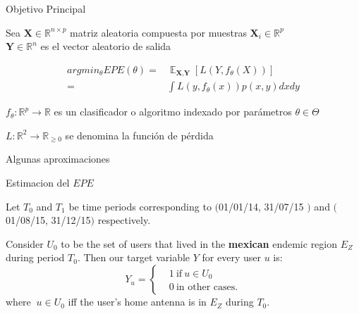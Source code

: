 \documentclass[xcolor=x11names]{beamer}
\DeclareMathOperator{\Expect}{\mathbb{E}}
\begin{document}
\begin{frame}{Objetivo Principal}
		\centering

		Sea $\textbf{X} \in \mathbb{R}^{n \times p}$ matriz aleatoria compuesta por muestras $\textbf{X}_i \in \mathbb{R}^{p}$\\
		$\textbf{Y} \in \mathbb{R}^n$ es el vector aleatorio de salida 

	\begin{equation}%
		\begin{split}
		argmin_{\theta} EPE(\theta) = & \Expect_{\textbf{X},\textbf{Y}} \left[ L(Y,f_\theta(X))\right]  \\
			= & \int L(y,f_\theta (x)) p(x,y) dx dy
		\end{split}
	\end{equation}





	\smallskip
	$f_\theta: \mathbb{R}^{p} \rightarrow  \mathbb{R} $ es un clasificador o algoritmo indexado por parámetros $\theta \in \Theta$

	\smallskip
	$L: \mathbb{R}^{2} \rightarrow  \mathbb{R}_{\geq 0} $ se denomina la función de pérdida


\end{frame}

\begin{frame}{Algunas aproximaciones}

	\begin{block}{Estimacion del $EPE$}

			Let $T_0$ and $T_1$ be time periods corresponding to $($01/01/14, 31/07/15 $)$ and $($01/08/15, 31/12/15$)$ respectively.

			Consider $U_0$ to be the set of users that lived in the \textbf{mexican} endemic region $E_Z$ during period $T_0$. Then our target variable $Y$ for every user $u$ is:
			\[
			Y_u =
			\begin{cases}
			&1 \ \mbox{if} \ u \in U_0  \\
			&0 \ \mbox{in other cases}.
			\end{cases}
			\]
			where $\ u \in U_0$ iff the user's home antenna is in $E_Z$ during $T_0$.
			\end{block}
\end{frame}
\end{document}
